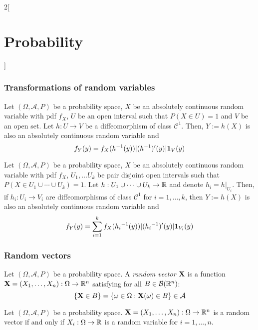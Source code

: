 \documentclass[../../../main.tex]{subfiles}
\begin{document}
\begin{multicols}{2}[\section{Probability}]
  \subsubsection*{Transformations of random variables}
  \begin{prop}
    Let $(\Omega,\mathcal{A},P)$ be a probability space, $X$ be an absolutely continuous random variable with pdf $f_X$, $U$ be an open interval such that $P(X\in U)=1$ and $V$ be an open set. Let $h:U\rightarrow V$ be a diffeomorphism of class $\mathcal{C}^1$. Then, $Y:=h(X)$ is also an absolutely continuous random variable and $$f_Y(y)=f_X(h^{-1}(y))|(h^{-1})'(y)|\boldsymbol{\mathrm{1}}_V(y)$$
  \end{prop}
  \begin{prop}
    Let $(\Omega,\mathcal{A},P)$ be a probability space, $X$ be an absolutely continuous random variable with pdf $f_X$, $U_1,\ldots U_k$ be pair disjoint open intervals such that $P(X\in U_1\cup \cdots\cup U_k)=1$. Let $h:U_1\cup \cdots\cup U_k\rightarrow \mathbb{R}$ and denote $h_i=h|_{U_i}$. Then, if $h_i:U_i\rightarrow V_i$ are  diffeomorphisms of class $\mathcal{C}^1$ for $i=1,\ldots,k$, then $Y:=h(X)$ is also an absolutely continuous random variable and $$f_Y(y)=\sum_{i=1}^kf_X({h_i}^{-1}(y))|({h_i}^{-1})'(y)|\boldsymbol{\mathrm{1}}_{V_i}(y)$$
  \end{prop}
  \subsubsection*{Random vectors}
  \begin{definition}
    Let $(\Omega,\mathcal{A},P)$ be a probability space. A \textit{random vector $\boldsymbol{\mathrm{X}}$} is a function $\boldsymbol{\mathrm{X}}=(X_1,\ldots,X_n):\Omega\rightarrow\mathbb{R}^n$ satisfying for all $B\in\mathcal{B}(\mathbb{R}^n)$: $$\{\boldsymbol{\mathrm{X}}\in B\}=\{\omega\in\Omega:\boldsymbol{\mathrm{X}}(\omega)\in B\}\in\mathcal{A}$$
  \end{definition}
  \begin{prop}
    Let $(\Omega,\mathcal{A},P)$ be a probability space. $\boldsymbol{\mathrm{X}}=(X_1,\ldots,X_n):\Omega\rightarrow\mathbb{R}^n$ is a random vector if and only if $X_i:\Omega\rightarrow\mathbb{R}$ is a random variable for $i=1,\ldots,n$.
  \end{prop}
\end{multicols}
\end{document}
